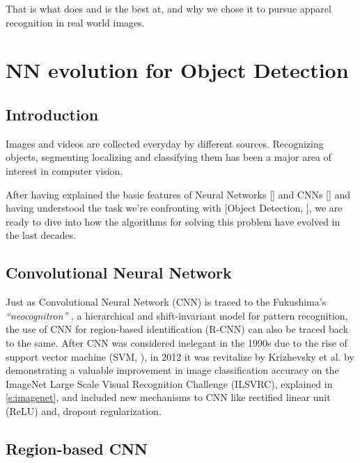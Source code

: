 That is what \maskrcnn does and is the best at, and why we chose it to pursue apparel recognition in real world images.



\section{NN evolution for Object Detection}\label{s:nnevo}

\subsection{Introduction}\label{s:nnevo-intro}

Images and videos are collected everyday by different sources. Recognizing objects, segmenting localizing and classifying them has been a major area of interest in computer vision. 

After having explained the basic features of Neural Networks [] and CNNs [] and having understood the task we're confronting with [Object Detection, ], we are ready to dive into how the algorithms for solving this problem have evolved in the last decades.

\subsection{Convolutional Neural Network}\label{s:nnevo-cnn}

Just as Convolutional Neural Network (CNN) is traced to the Fukushima’s \emph{ “neocognitron”} \cite{fukushima1980neocognitron}, a hierarchical and shift-invariant model for pattern recognition, the use of CNN for region-based identification (R-CNN)\cite{Girshick_2014} can also be traced back to the same.  After CNN was considered inelegant in the 1990s due to the rise of support vector machine (SVM, ), in 2012 it was revitalize by Krizhevsky et al. \cite{krizhevsky2012imagenet} by demonstrating a valuable improvement in image classification accuracy on the ImageNet Large Scale Visual Recognition Challenge (ILSVRC), explained in \ref{s:imagenet}, and included new mechanisms to CNN like rectified linear unit (ReLU) and, dropout regularization. 

\subsection{Region-based CNN}\label{s:nnevo-rcnn}

